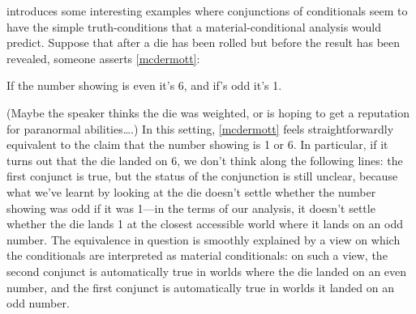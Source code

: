 \documentclass[If.tex]{subfiles}
\begin{document}

\citet{McDermottTCS} introduces some interesting examples where conjunctions of conditionals seem to have the simple truth-conditions that a material-conditional analysis would predict.  Suppose that after a die has been rolled but before the result has been revealed, someone asserts \ref{mcdermott}:
\begin{prop}
	\nitem \label{mcdermott}
	If the number showing is even it's 6, and if's odd it's 1.
\end{prop}
(Maybe the speaker thinks the die was weighted, or is hoping to get a reputation for  paranormal abilities….)  In this setting, \ref{mcdermott} feels straightforwardly equivalent to the claim that the number showing is 1 or 6.  In particular, if it turns out that the die landed on 6, we don't think along the following lines: the first conjunct is true, but the status of the conjunction is still unclear, because what we've learnt by looking at the die doesn't settle whether the number showing was odd if it was 1---in the terms of our analysis, it doesn't settle whether the die lands 1 at the closest accessible world where it lands on an odd number.  The equivalence in question is smoothly explained by a view on which the conditionals are interpreted as material conditionals: on such a view, the second conjunct is automatically true in worlds where the die landed on an even number, and the first conjunct is automatically true in worlds it landed on an odd number.  
\end{document}
